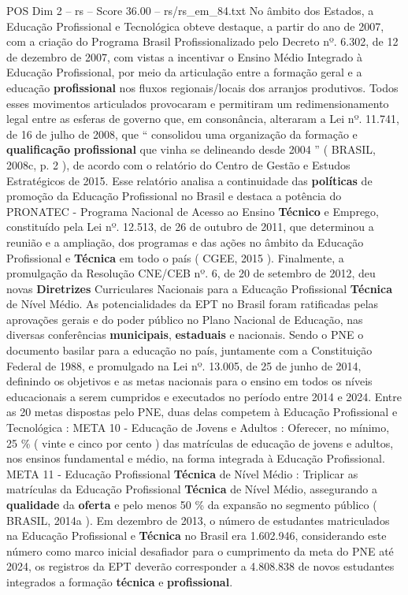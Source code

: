 \begin{textsample}{POS Dim 2 – rs – Score 36.00 – rs/rs\_em\_84.txt}
No âmbito dos Estados, a Educação Profissional e Tecnológica obteve destaque, a partir do ano de 2007, com a criação do Programa Brasil Profissionalizado pelo Decreto nº. 6.302, de 12 de dezembro de 2007, com vistas a incentivar o Ensino Médio Integrado à Educação Profissional, por meio da articulação entre a formação geral e a educação \textbf{profissional} nos fluxos regionais/locais dos arranjos produtivos.
Todos esses movimentos articulados provocaram e permitiram um redimensionamento legal entre as esferas de governo que, em consonância, alteraram a Lei nº. 11.741, de 16 de julho de 2008, que “ consolidou uma organização da formação e \textbf{qualificação} \textbf{profissional} que vinha se delineando desde 2004 ” ( BRASIL, 2008c, p. 2 ), de acordo com o relatório do Centro de Gestão e Estudos Estratégicos de 2015.
Esse relatório analisa a continuidade das \textbf{políticas} de promoção da Educação Profissional no Brasil e destaca a potência do PRONATEC - Programa Nacional de Acesso ao Ensino \textbf{Técnico} e Emprego, constituído pela Lei nº. 12.513, de 26 de outubro de 2011, que determinou a reunião e a ampliação, dos programas e das ações no âmbito da Educação Profissional e \textbf{Técnica} em todo o país ( CGEE, 2015 ).
Finalmente, a promulgação da Resolução CNE/CEB nº. 6, de 20 de setembro de 2012, deu novas \textbf{Diretrizes} Curriculares Nacionais para a Educação Profissional \textbf{Técnica} de Nível Médio.
As potencialidades da EPT no Brasil foram ratificadas pelas aprovações gerais e do poder público no Plano Nacional de Educação, nas diversas conferências \textbf{municipais}, \textbf{estaduais} e nacionais.
Sendo o PNE o documento basilar para a educação no país, juntamente com a Constituição Federal de 1988, e promulgado na Lei nº. 13.005, de 25 de junho de 2014, definindo os objetivos e as metas nacionais para o ensino em todos os níveis educacionais a serem cumpridos e executados no período entre 2014 e 2024.
Entre as 20 metas dispostas pelo PNE, duas delas competem à Educação Profissional e Tecnológica : META 10 - Educação de Jovens e Adultos : Oferecer, no mínimo, 25 \% ( vinte e cinco por cento ) das matrículas de educação de jovens e adultos, nos ensinos fundamental e médio, na forma integrada à Educação Profissional.
META 11 - Educação Profissional \textbf{Técnica} de Nível Médio : Triplicar as matrículas da Educação Profissional \textbf{Técnica} de Nível Médio, assegurando a \textbf{qualidade} da \textbf{oferta} e pelo menos 50 \% da expansão no segmento público ( BRASIL, 2014a ).
Em dezembro de 2013, o número de estudantes matriculados na Educação Profissional e \textbf{Técnica} no Brasil era 1.602.946, considerando este número como marco inicial desafiador para o cumprimento da meta do PNE até 2024, os registros da EPT deverão corresponder a 4.808.838 de novos estudantes integrados a formação \textbf{técnica} e \textbf{profissional}.

\end{textsample}
